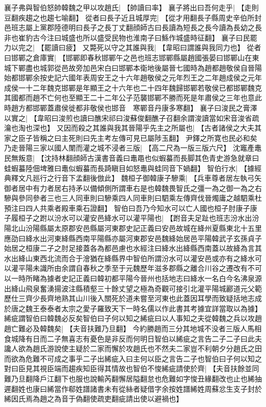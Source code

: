 襄子弗與智伯怒帥韓魏之甲以攻趙氏|{
	【帥讀曰率】}
襄子將出曰吾何走乎|{
	【走則豆翻疾趨之也趨七喻翻】}
從者曰長子近且城厚完|{
	【從才用翻長子縣周史辛伯所封邑班志屬上黨郡陸德明曰長子之長丁丈翻顔師古曰長讀為短長之長今讀為長幼之長非也崔豹古今注曰城盛也所以盛受民物也淮南子曰鯀作城盛時征翻】}
襄子曰民罷力以完之|{
	【罷讀曰疲】}
又斃死以守之其誰與我|{
	【韋昭曰謂誰與我同力也】}
從者曰邯鄲之倉庫實|{
	【邯鄲即春秋邯鄲午之邑也班志邯鄲縣屬趙國張晏曰邯鄲山在東城下鄲盡也城郭從邑故旁加邑宋白曰邯鄲本衛地後屬晉七國時為趙都趙敬侯自晉陽始都邯鄲余按史記六國年表周安王之十六年趙敬侯之元年烈王之二年趙成侯之元年成侯一十二年魏克邯鄲是年顯王之十六年也二十四年魏歸邯鄲若敬侯已都邯鄲魏克其國都而趙不亡何也至顯王二十二年公子范襲邯鄲不勝而死是年肅侯之三年也意此時趙方都邯鄲蓋肅侯徙都非敬侯也邯音　寒鄲音丹康多寒翻】}
襄子曰浚民之膏澤以實之|{
	【韋昭曰浚煎也讀曰醮宋祁曰浚蘇俊翻醮子召翻余謂浚讀當如宋音浚省疏瀹也淘也深也】}
又因而殺之其誰與我其晉陽乎先主之所屬也|{
	【古者諸侯之大夫其家之臣子皆稱之曰主死則曰先主考左傳可見已屬陟玉翻】}
尹鐸之所寛也民必和矣乃走晉陽三家以國人闈而灌之城不浸者三版|{
	【高二尺為一版三版六尺】}
沈竈產鼃民無叛意|{
	【沈持林翻顔師古漢書音義曰鼃黽也似蝦蟇而長脚其色青史游急就章曰蛙蝦蟇陸佃埤雅曰鼃似蝦蟇而長踦瞋目如怒鼃與蛙同音下媧翻】}
智伯行水|{
	【據經典釋文凡廵行之行音下孟翻後倣此】}
魏桓子御韓康子驂乘|{
	【兵車尊者居左執弓矢御者居中有力者居右持矛以備傾側所謂車右是也韓魏畏智氏之彊一為之御一為之右驂與參同參者三也三人同車則曰驂乘四人同車則曰駟乘左傳齊伐晉燭庸之越駟乘杜預注曰四人共乘者殿車乘石證翻】}
智伯曰吾乃今知水可以亡人國也桓子肘康子康子履桓子之跗以汾水可以灌安邑絳水可以灌平陽也|{
	【跗音夫足趾也班志汾水出汾陽北山汾陽縣屬太原郡安邑縣屬河東郡史記正義曰安邑故城在絳州夏縣東北十五里應劭曰絳水出河東絳縣西南平陽縣亦屬河東郡安邑魏絳始居邑平陽韓武子玄孫貞子始居之桓康二子之肘足接蓋各為都邑慮也水經注曰絳水出絳縣西南蓋以故絳為言其水出絳山東西北流而合于澮猶在絳縣界中智伯所謂汾水可以灌安邑或亦有之絳水可以灌平陽未識所由余謂自春秋之季至于元魏歷年滋多郡縣之離合川谷之遷改有不可以一時所睹為據者史記正義曰韓初都平陽今晉州也括地志曰絳水一名白今名沸泉源出絳山飛泉奮湧揚波注縣積壑三十餘丈望之極為奇觀可接引北灌平陽城酈道元父範歷仕三齊少長齊地熟其山川後入關死於道未嘗至河東也此蓋因耳學而致疑括地志成於唐之魏王泰泰者太宗之愛子羅致天下一時名儒以作此書其考據宜詳當取以為據】}
絺疵謂智伯曰韓魏必反矣智伯曰子何以知之絺疵曰以人事知之夫從韓魏之兵以攻趙趙亡難必及韓魏矣|{
	【夫音扶難乃旦翻】}
今約勝趙而三分其地城不没者三版人馬相食城降有日而二子無喜志有憂色是非反而何明日智伯以絺疵之言告二子二子曰此夫讒人欲為趙氏游說使主疑於二家而懈於攻趙氏也不然夫二家豈不利朝夕分趙氏之田而欲為危難不可成之事乎二子出絺疵入曰主何以臣之言告二子也智伯曰子何以知之對曰臣見其視臣端而趨疾知臣得其情故也智伯不悛絺疵請使於齊|{
	【夫音扶餘並同難乃旦翻降戶江翻下也服也說輸芮翻懈居隘翻怠也危難如字悛丑緣翻改也止也絺抽遲翻姓也康曰絺當作郗姓譜諸書未有從絲者疑借字余按姓譜絺姓周蘇忿生支子封於絺因氏焉為趙之為音于偽翻使疏吏翻疵請出使以避禍也】}
